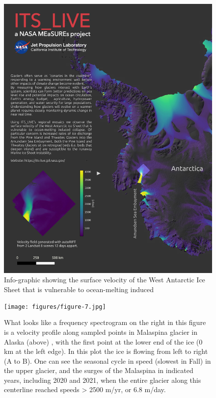 \documentclass[
  super,
  preprint,
  3p,
  twocolumn]{elsarticle}
\begin{document}
\begin{figure}

{\centering 

\includegraphics{figures/figure-6.jpg}

}

\caption{\label{fig-4}Info-graphic showing the surface velocity of the
West Antarctic Ice Sheet that is vulnerable to ocean-melting induced
\citep[collapse][]{Joughin2011-mq, Greene2022-uo, Naughten2023}}

\end{figure}

\begin{figure}

{\centering 

\texttt{[image: figures/figure-7.jpg]}

}

\caption{\label{fig-5}What looks like a frequency spectrogram on the
right in this figure is a velocity profile along sampled points in
Malaspina glacier in Alaska (above) , with the first point at the lower
end of the ice (0 km at the left edge). In this plot the ice is flowing
from left to right (A to B). One can see the seasonal cycle in speed
(slowest in Fall) in the upper glacier, and the surges of the Malaspina
in indicated years, including 2020 and 2021, when the entire glacier
along this centerline reached speeds \textgreater{} 2500 m/yr, or 6.8
m/day.}

\end{figure}
\end{document}
